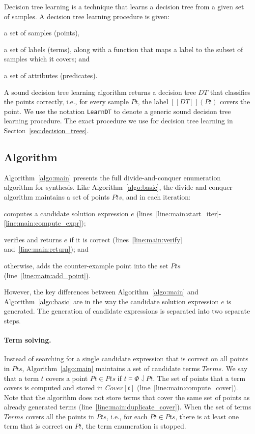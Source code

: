 \documentclass{llncs}
\newcommand\Points{\mathit{Pts}}
\newcommand\Point{\mathit{Pt}}
\newcommand\Expr{e}
\newcommand\Terms{\mathit{Terms}}
\newcommand\Term{t}
\newcommand\Cover{\mathit{Cover}}
\newcommand\Spec{\Phi}
\newcommand\sem[1]{[\![ #1 ]\!]}
\newcommand\DecisionTree{\mathit{DT}}
\begin{document}
Decision tree learning is a technique that learns a decision tree from a
given set of samples.
A decision tree learning procedure is given:
\begin{inparaenum}[(a)]
\item a set of samples (points),
\item a set of labels (terms), along with a function that maps a label to the
  subset of samples which it covers; and
\item a set of attributes (predicates).
\end{inparaenum}
A sound decision tree learning algorithm returns a decision tree
$\DecisionTree$ that classifies the points correctly, i.e., for every
sample $\Point$, the label $\sem{\DecisionTree}(\Point)$ covers the
point.
We use the notation {\tt LearnDT} to denote a generic sound
decision tree learning procedure.
The exact procedure we use for decision tree learning in
Section~\ref{sec:decision_trees}.

\subsection{Algorithm}
\label{sec:algo:main}

Algorithm~\ref{algo:main} presents the full divide-and-conquer
enumeration algorithm for synthesis.
Like Algorithm~\ref{algo:basic}, the divide-and-conquer algorithm
maintains a set of points $\Points$, and in each iteration:
\begin{inparaenum}[(a)]
\item computes a candidate solution expression $\Expr$
  (lines~\ref{line:main:start_iter}-\ref{line:main:compute_expr});
\item verifies and returns $\Expr$ if it is correct (lines~\ref{line:main:verify}
  and~\ref{line:main:return}); and
\item otherwise, adds the counter-example point into the set $\Points$
  (line~\ref{line:main:add_point}).
\end{inparaenum}

However, the key differences between Algorithm~\ref{algo:main} and
Algorithm~\ref{algo:basic} are in the way the candidate solution
expression $\Expr$ is generated.
The generation of candidate expressions is separated into two separate
steps.

\paragraph{Term solving.}
Instead of searching for a single candidate expression that is correct
on all points in $\Points$, Algorithm~\ref{algo:main} maintains a set of
candidate terms $\Terms$.
We say that a term $\Term$ covers a point $\Point \in \Points$ if $\Term
\models \Spec \downharpoonleft \Point$.
The set of points that a term covers is computed and stored in
$\Cover[\Term]$ (line~\ref{line:main:compute_cover}).
Note that the algorithm does not store terms that cover the same set of
points as already generated terms
(line~\ref{line:main:duplicate_cover}).
When the set of terms $\Terms$ covers all the points in $\Points$, i.e., for
each $\Point \in \Points$, there is at least one term that is correct on
$\Point$, the term enumeration is stopped.
\end{document}
